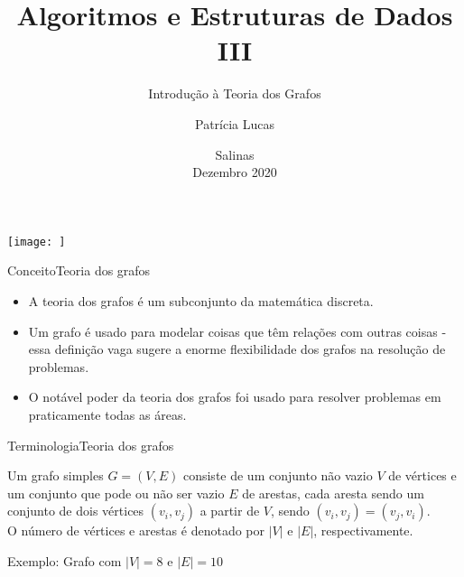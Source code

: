 \documentclass[t]{beamer}
\title[]{Algoritmos e Estruturas de Dados III}
\subtitle[]{Introdução à Teoria dos Grafos}
\author[]{Patrícia Lucas\\{\footnotesize }}
\institute{Bacharelado em Sistemas de Informação \\ IFNMG  - Campus Salinas}
\date{\scriptsize Salinas\\Dezembro 2020}
\begin{document}
\begin{frame}

\begin{center}
\texttt{[image: ]}
\end{center}
  \titlepage
\end{frame}

\begin{ftst}{Conceito}{Teoria dos grafos}

\begin{itemize}
    \item A teoria dos grafos é um subconjunto da matemática discreta. 
    \item Um grafo é usado para modelar coisas que têm relações com outras coisas - essa definição vaga sugere a enorme flexibilidade dos grafos na resolução de problemas. 
    \item O notável poder da teoria dos grafos foi usado para resolver problemas em praticamente todas as áreas.
\end{itemize}

\end{ftst}


\begin{ftst}{Terminologia}{Teoria dos grafos}

Um grafo simples $G =(V,E)$ consiste de um conjunto não vazio $V$ de vértices e um conjunto que pode ou não ser vazio $E$ de arestas, cada aresta sendo um conjunto de dois vértices $(v_i, v_j)$ a partir de $V$, sendo $(v_i,v_j)=(v_j,v_i)$. \\
\vone
O número de vértices e arestas é denotado por $|V|$ e $|E|$, respectivamente.

\centering 
Exemplo: Grafo com $|V| = 8$ e $|E| = 10$

\end{ftst}

\end{document}
